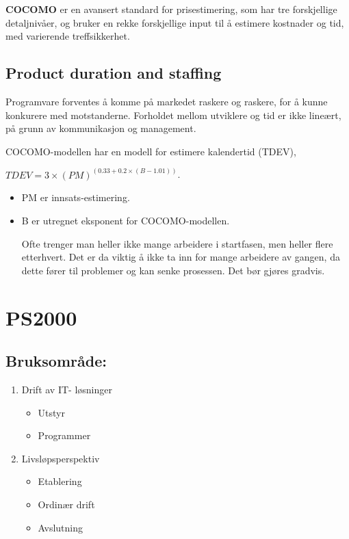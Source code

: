 \documentclass[11pt]{article}
\begin{document}
   \textbf{COCOMO} er en avansert standard for prisestimering, som har tre forskjellige detaljnivåer,
   og bruker en rekke forskjellige input til å estimere kostnader og tid, med varierende treffsikkerhet. 
\subsection{Product duration and staffing}
\label{sec-10.4}

   Programvare forventes å komme på markedet raskere og raskere, for å kunne konkurere med motstanderne. 
   Forholdet mellom utviklere og tid er ikke lineært, på grunn av kommunikasjon og management.

   COCOMO-modellen har en modell for estimere kalendertid (TDEV), 
   
   $TDEV = 3 \times (PM)^{(0.33+0.2 \times (B-1.01))}$.
   
\begin{itemize}
\item PM er innsats-estimering.
\item B er utregnet eksponent for COCOMO-modellen.

     Ofte trenger man heller ikke mange arbeidere i startfasen, men heller flere etterhvert. 
     Det er da viktig å ikke ta inn for mange arbeidere av gangen, da dette fører til problemer
     og kan senke prosessen. Det bør gjøres gradvis.
\end{itemize}
\section{PS2000}
\label{sec-11}
\subsection{Bruksområde:}
\label{sec-11.1}

\begin{enumerate}
\item Drift av IT- løsninger

\begin{itemize}
\item Utstyr
\item Programmer
\end{itemize}

\item Livsløpsperspektiv

\begin{itemize}
\item Etablering
\item Ordinær drift
\item Avslutning
\end{itemize}

\end{enumerate}
\end{document}
